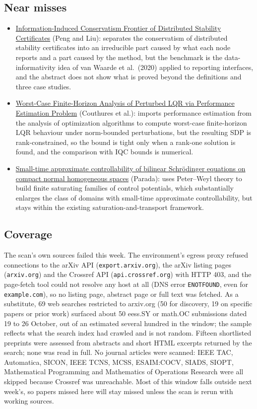 \documentclass[11pt,a4paper]{article}
\begin{document}
\subsection*{Near misses}
\begin{itemize}[leftmargin=*]
  \item \href{https://arxiv.org/abs/2610.29757}{Information-Induced Conservatism Frontier of Distributed Stability Certificates} (Peng and Liu): separates the conservatism of distributed stability certificates into an irreducible part caused by what each node reports and a part caused by the method, but the benchmark is the data-informativity idea of van Waarde et al.\ (2020) applied to reporting interfaces, and the abstract does not show what is proved beyond the definitions and three case studies.
  \item \href{https://arxiv.org/abs/2610.29910}{Worst-Case Finite-Horizon Analysis of Perturbed LQR via Performance Estimation Problem} (Couthures et al.): imports performance estimation from the analysis of optimization algorithms to compute worst-case finite-horizon \ac{LQR} behaviour under norm-bounded perturbations, but the resulting \ac{SDP} is rank-constrained, so the bound is tight only when a rank-one solution is found, and the comparison with \ac{IQC} bounds is numerical.
  \item \href{https://arxiv.org/abs/2610.29940}{Small-time approximate controllability of bilinear Schr{\"o}dinger equations on compact normal homogeneous spaces} (Parada): uses Peter--Weyl theory to build finite saturating families of control potentials, which substantially enlarges the class of domains with small-time approximate controllability, but stays within the existing saturation-and-transport framework.
\end{itemize}

\subsection*{Coverage}
The scan's own sources failed this week. The environment's egress proxy refused connections to the arXiv API (\texttt{export.arxiv.org}), the arXiv listing pages (\texttt{arxiv.org}) and the Crossref API (\texttt{api.crossref.org}) with HTTP 403, and the page-fetch tool could not resolve any host at all (DNS error \texttt{ENOTFOUND}, even for \texttt{example.com}), so no listing page, abstract page or full text was fetched. As a substitute, 69 web searches restricted to arxiv.org (50 for discovery, 19 on specific papers or prior work) surfaced about 50 eess.SY or math.OC submissions dated 19 to 26 October, out of an estimated several hundred in the window; the sample reflects what the search index had crawled and is not random. Fifteen shortlisted preprints were assessed from abstracts and short HTML excerpts returned by the search; none was read in full. No journal articles were scanned: IEEE TAC, Automatica, SICON, IEEE TCNS, MCSS, ESAIM:COCV, SIADS, SIOPT, Mathematical Programming and Mathematics of Operations Research were all skipped because Crossref was unreachable. Most of this window falls outside next week's, so papers missed here will stay missed unless the scan is rerun with working sources.

\nocite{*}


\end{document}
